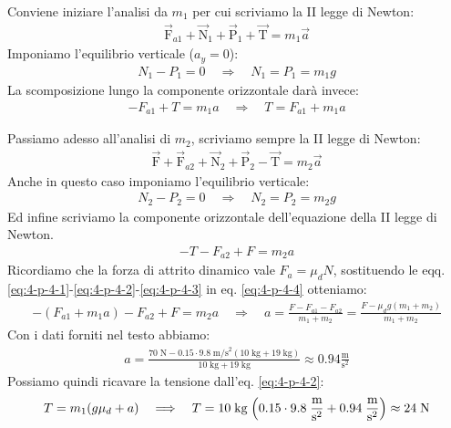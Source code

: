 \documentclass[12pt,a4paper]{book}
\begin{document}
Conviene iniziare l'analisi da $m_1$ per cui scriviamo la II legge di Newton:
%
\begin{gather*}
\vec{\text{F}}_{a1}+\vec{\text{N}}_1+\vec{\text{P}}_1+\vec{\text{T}}=m_1\vec{a}
\end{gather*}
%
Imponiamo l'equilibrio verticale ($a_y=0$):
%
\begin{gather}
N_1-P_1=0 \quad	\Longrightarrow \quad N_1=P_1=m_1g
\label{eq:4-p-4-1} 
\end{gather}
%
La scomposizione lungo la componente orizzontale darà invece:
%
\begin{gather}
-F_{a1}+T=m_1a \quad	\Longrightarrow \quad T=F_{a1}+m_1a
\label{eq:4-p-4-2} 
\end{gather}
%

Passiamo adesso all'analisi di $m_2$, scriviamo sempre la II legge di Newton:
%
\begin{gather*}
\vec{\text{F}}+\vec{\text{F}}_{a2}+\vec{\text{N}}_2+\vec{\text{P}}_2-\vec{\text{T}}=m_2\vec{a}
\end{gather*}
%
Anche in questo caso imponiamo l'equilibrio verticale:
%
\begin{gather}
N_2-P_2=0 \quad	\Longrightarrow \quad N_2=P_2=m_2g
\label{eq:4-p-4-3} 
\end{gather}
%
Ed infine scriviamo la componente orizzontale dell'equazione della II legge di Newton.
%
\begin{gather}
-T-F_{a2}+F=m_2a
\label{eq:4-p-4-4} 
\end{gather}
%
Ricordiamo che la forza di attrito dinamico vale $F_a=\mu_dN$, sostituendo le eqq. \ref{eq:4-p-4-1}-\ref{eq:4-p-4-2}-\ref{eq:4-p-4-3} in eq. \ref{eq:4-p-4-4} otteniamo:
%
\begin{gather*}
-(F_{a1}+m_1a)-F_{a2}+F=m_2a \quad	\Longrightarrow \quad a= \frac{F-F_{a1}-F_{a2}}{m_1+m_2}=\frac{F-\mu_dg(m_1+m_2)}{m_1+m_2}
\end{gather*}
%
Con i dati forniti nel testo abbiamo:
%
\begin{gather*}
a=\frac{70\;\text{N}-0.15 \cdot 9.8\;\text{m/s}^2(10\;\text{kg}+19\;\text{kg})}{10\;\text{kg}+19\;\text{kg}}\approx 0.94 \frac{\text{m}}{\text{s}^2}
\end{gather*}
%
Possiamo quindi ricavare la tensione dall'eq. \ref{eq:4-p-4-2}:
%
\begin{gather*}
T=m_1(g\mu_d+a) \quad \Longrightarrow \quad T=10\;\text{kg} \; \qty(0.15 \cdot 9.8 \;\frac{\text{m}}{\text{s}^2} + 0.94\;\frac{\text{m}}{\text{s}^2})\approx 24\;\text{N}
\end{gather*}
%
\end{document}
